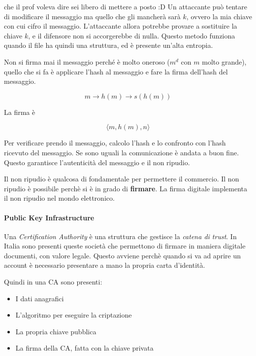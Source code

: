 che il prof voleva dire sei libero di mettere a posto :D
Un attaccante può tentare di modificare il messaggio ma quello che gli mancherà
sarà $k$, ovvero la mia chiave con cui cifro il messaggio.
L'attaccante allora potrebbe provare a sostituire la chiave $k$, e il difensore
non si accorgerebbe di nulla. Questo metodo funziona quando il file ha quindi
una struttura, ed è presente un'alta entropia.

Non si firma mai il messaggio perché è molto oneroso ($m^d$ con $m$ molto
grande), quello che si fa è applicare l'hash al messaggio e fare la firma
dell'hash del messaggio.

$$
m \rightarrow h(m) \rightarrow s(h(m))
$$

La firma è

$$
\langle m, h(m), n \rangle
$$

Per verificare prendo il messaggio, calcolo l'hash e lo confronto con l'hash
ricevuto del messaggio. Se sono uguali la comunicazione è andata a buon fine.
Questo garantisce l'autenticità del messaggio e il non ripudio.

Il non ripudio è qualcosa di fondamentale per permettere il commercio. Il non
ripudio è possibile perchè si è in grado di \textbf{firmare}. La firma digitale
implementa il non ripudio nel mondo elettronico.

\paragraph{Public Key Infrastructure}


Una \textit{Certification Authority} è una struttura che gestisce la
\textit{catena di trust}. In Italia sono presenti queste società che permettono
di firmare in maniera digitale documenti, con valore legale. Questo avviene
perchè quando si va ad aprire un account è necessario presentare a mano la
propria carta d'identità.

Quindi in una CA sono presenti:
\begin{itemize}
\item I dati anagrafici
\item L'algoritmo per eseguire la criptazione
\item La propria chiave pubblica
\item La firma della CA, fatta con la chiave privata
\end{itemize}

